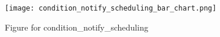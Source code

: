 \begin{figure}[H]
\centering
\texttt{[image: condition\_notify\_scheduling\_bar\_chart.png]}
\caption{Figure for condition_notify_scheduling}
\end{figure}
